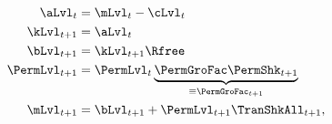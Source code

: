  \begin{equation}\label{eq:DBCparts}
   \begin{split}
     \aLvl_{t}     & = \mLvl_{t}-\cLvl_{t}
\\     \kLvl_{t+1}   & = \aLvl_{t} \notag
\\      \bLvl_{t+1}    & = \kLvl_{t+1} \Rfree \notag \\
      \PermLvl_{t+1}  & = \PermLvl_{t} \underbrace{\PermGroFac\PermShk_{t+1}}_{\equiv \PermGroFac_{t+1}} \notag \\
      \mLvl_{t+1}  & =  \bLvl_{t+1} +\PermLvl_{t+1}\TranShkAll_{t+1},\notag
   \end{split}
  \end{equation}

